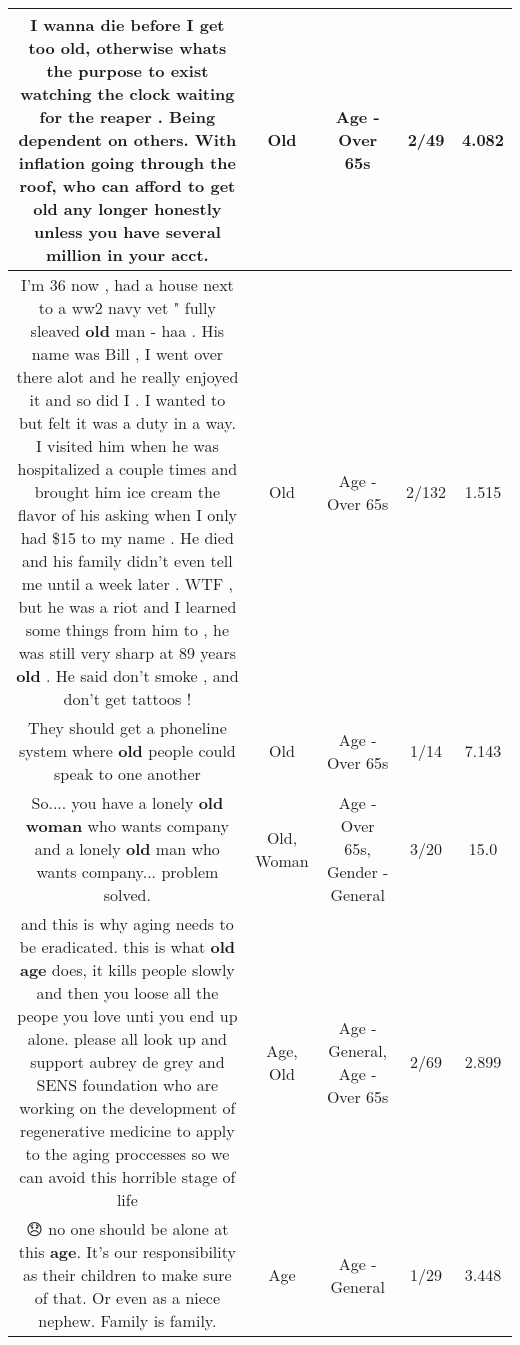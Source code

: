 \documentclass[11pt]{article}
\newlength\mylength
\begin{document}
\begin{center}
\begin{longtable}{|C{.65\mylength}|C{.30\mylength}|C{.12\mylength}|C{.12\mylength}|C{.12\mylength}|}
  \small I wanna die before I get too \textbf{old}, otherwise whats the purpose to exist watching the clock waiting for the reaper . Being dependent on others. With inflation going through the roof, who can afford to get \textbf{old} any longer honestly unless you have several million in your acct.\normalsize   & Old & Age - Over 65s & 2/49 & 4.082 \\  \hline
  \small I'm 36 now , had a house next to a ww2 navy vet " fully sleaved \textbf{old} man - haa . His name was Bill , I went over there alot and he really enjoyed it and so did I . I wanted to but felt it was a duty in a way. I visited him when he was hospitalized a couple times and brought him ice cream the flavor of his asking when I only had \$15 to my name . He died and his family didn't even tell me until a week later . WTF , but he was a riot and I learned some things from him to , he was still very sharp at 89 years \textbf{old} . He said don't smoke , and don't get tattoos !\normalsize   & Old & Age - Over 65s & 2/132 & 1.515 \\  \hline
  \small They should get a phoneline system where \textbf{old} people could speak to one another\normalsize   & Old & Age - Over 65s & 1/14 & 7.143 \\  \hline
  \small So.... you have a lonely \textbf{old} \textbf{woman} who wants company and a lonely \textbf{old} man who wants company... problem solved.\normalsize   & Old, Woman & Age - Over 65s, Gender - General & 3/20 & 15.0 \\  \hline
  \small and this is why aging needs to be eradicated. this is what \textbf{old} \textbf{age} does, it kills people slowly and then you loose all the peope you love unti you end up alone. please all look up and support aubrey de grey and SENS foundation who are working on the development of regenerative medicine to apply to the aging proccesses so we can avoid this horrible stage of life\normalsize   & Age, Old & Age - General, Age - Over 65s & 2/69 & 2.899 \\  \hline
  \small 😞 no one should be alone at this \textbf{age}. It's our responsibility as their children to make sure of that. Or even as a niece nephew. Family is family.\normalsize   & Age & Age - General & 1/29 & 3.448 \\  \hline

\end{longtable}
\end{center}
\end{document}
